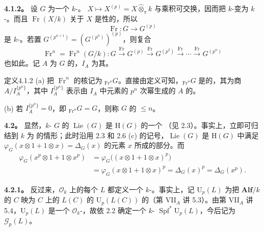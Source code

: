 \textbf{4.1.2。} 设 $G$ 为一个 $k$-。 $X\mapsto X^{(p)}=X\widehat\otimes_\pi k$ 与乘积可交换，因而把 $k$-变为 $k$-。而且 $\operatorname{Fr}(X/k)$ 关于 $X$ 是性的，所以
\[\operatorname{Fr}:G\longrightarrow G^{(p)}\]
是 $k$-。若置 $G^{(p^{n+1})}=(G^{(p^n)})^{(p)}$，则复合
\[
\operatorname{Fr}^n=\operatorname{Fr}^n(G/k):
G\xrightarrow{\operatorname{Fr}}G^{(p)}\xrightarrow{\operatorname{Fr}}G^{(p^2)}\xrightarrow{\operatorname{Fr}}\cdots\xrightarrow{\operatorname{Fr}}G^{(p^n)}
\]
也如此。记 $A$ 为 $G$ 的，$I_A$ 为其。

\begin{SGAresult}{定义}{4.1.2}
(a) 把 $\operatorname{Fr}^n$ 的核记为 ${}_{\operatorname{Fr}^n}G$。直接由定义可知，${}_{\operatorname{Fr}^n}G$ 是的，其为商 $A/I_A^{\{p^n\}}$，其中 $I_A^{\{p^n\}}$ 表示由 $I_A$ 中元素的 $p^n$ 次幂生成的 $A$ 的。

(b) 若 $I_A^{\{p^n\}}=0$，即 ${}_{\operatorname{Fr}^n}G=G$，则称 $G$ 的 $\leq n$。
\end{SGAresult}

\textbf{4.2。} 显然，$k$- $G$ 的  $\operatorname{Lie}(G)$ 是 $\mathrm H(G)$ 的一个 （见 2.3）。事实上，立即可归结到 $k$ 为 的情形；此时沿用 2.3 和 2.6 (c) 的记号，$\operatorname{Lie}(G)$ 是 $\mathrm H(G)$ 中满足 $\varphi_G(x\otimes1+1\otimes x)=\Delta_G(x)$ 的元素 $x$ 所成的部分。而
\[
\begin{aligned}
\varphi_G(x^p\otimes1+1\otimes x^p)
&=\varphi_G\bigl((x\otimes1+1\otimes x)^p\bigr)\\
&=\varphi_G(x\otimes1+1\otimes x)^p
=\Delta_G(x)^p=\Delta_G(x^p).
\end{aligned}
\]

\textbf{4.2.1。} 反过来，$\mathcal O_k$ 上的每个  $L$ 都定义一个 $k$-。事实上，记 $\mathrm U_p(L)$ 为把 $\mathbf{Alf}/k$ 的 $C$ 映为 $C$ 上的  $L(C)$ 的 $\mathrm U_p(L(C))$ 的（第 VII$_A$ 讲 5.3）。由第 VII$_A$ 讲 5.4，$\mathrm U_p(L)$ 是一个 $\mathcal O_k$-，故依 2.2 确定一个 $k$- $\operatorname{Spf}^{*}\mathrm U_p(L)$，今后记为 $\mathscr G_p(L)$。

